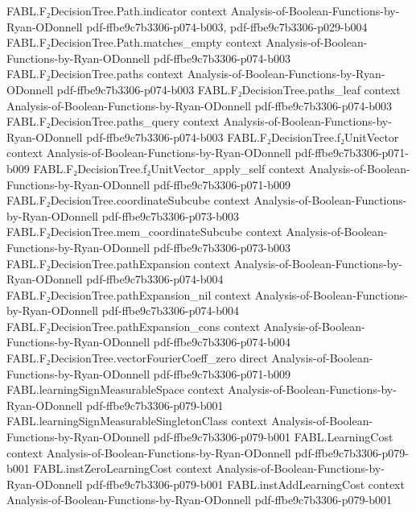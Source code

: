 \begin{theorem}
\proofstep
  {FABL.F₂DecisionTree.Path.indicator}
  {context}
  {Analysis-of-Boolean-Functions-by-Ryan-ODonnell}
  {pdf-ffbe9c7b3306-p074-b003,
    pdf-ffbe9c7b3306-p029-b004}
\proofstep
  {FABL.F₂DecisionTree.Path.matches_empty}
  {context}
  {Analysis-of-Boolean-Functions-by-Ryan-ODonnell}
  {pdf-ffbe9c7b3306-p074-b003}
\proofstep
  {FABL.F₂DecisionTree.paths}
  {context}
  {Analysis-of-Boolean-Functions-by-Ryan-ODonnell}
  {pdf-ffbe9c7b3306-p074-b003}
\proofstep
  {FABL.F₂DecisionTree.paths_leaf}
  {context}
  {Analysis-of-Boolean-Functions-by-Ryan-ODonnell}
  {pdf-ffbe9c7b3306-p074-b003}
\proofstep
  {FABL.F₂DecisionTree.paths_query}
  {context}
  {Analysis-of-Boolean-Functions-by-Ryan-ODonnell}
  {pdf-ffbe9c7b3306-p074-b003}
\proofstep
  {FABL.F₂DecisionTree.f₂UnitVector}
  {context}
  {Analysis-of-Boolean-Functions-by-Ryan-ODonnell}
  {pdf-ffbe9c7b3306-p071-b009}
\proofstep
  {FABL.F₂DecisionTree.f₂UnitVector_apply_self}
  {context}
  {Analysis-of-Boolean-Functions-by-Ryan-ODonnell}
  {pdf-ffbe9c7b3306-p071-b009}
\proofstep
  {FABL.F₂DecisionTree.coordinateSubcube}
  {context}
  {Analysis-of-Boolean-Functions-by-Ryan-ODonnell}
  {pdf-ffbe9c7b3306-p073-b003}
\proofstep
  {FABL.F₂DecisionTree.mem_coordinateSubcube}
  {context}
  {Analysis-of-Boolean-Functions-by-Ryan-ODonnell}
  {pdf-ffbe9c7b3306-p073-b003}
\proofstep
  {FABL.F₂DecisionTree.pathExpansion}
  {context}
  {Analysis-of-Boolean-Functions-by-Ryan-ODonnell}
  {pdf-ffbe9c7b3306-p074-b004}
\proofstep
  {FABL.F₂DecisionTree.pathExpansion_nil}
  {context}
  {Analysis-of-Boolean-Functions-by-Ryan-ODonnell}
  {pdf-ffbe9c7b3306-p074-b004}
\proofstep
  {FABL.F₂DecisionTree.pathExpansion_cons}
  {context}
  {Analysis-of-Boolean-Functions-by-Ryan-ODonnell}
  {pdf-ffbe9c7b3306-p074-b004}
\proofstep
  {FABL.F₂DecisionTree.vectorFourierCoeff_zero}
  {direct}
  {Analysis-of-Boolean-Functions-by-Ryan-ODonnell}
  {pdf-ffbe9c7b3306-p071-b009}
\proofstep
  {FABL.learningSignMeasurableSpace}
  {context}
  {Analysis-of-Boolean-Functions-by-Ryan-ODonnell}
  {pdf-ffbe9c7b3306-p079-b001}
\proofstep
  {FABL.learningSignMeasurableSingletonClass}
  {context}
  {Analysis-of-Boolean-Functions-by-Ryan-ODonnell}
  {pdf-ffbe9c7b3306-p079-b001}
\proofstep
  {FABL.LearningCost}
  {context}
  {Analysis-of-Boolean-Functions-by-Ryan-ODonnell}
  {pdf-ffbe9c7b3306-p079-b001}
\proofstep
  {FABL.instZeroLearningCost}
  {context}
  {Analysis-of-Boolean-Functions-by-Ryan-ODonnell}
  {pdf-ffbe9c7b3306-p079-b001}
\proofstep
  {FABL.instAddLearningCost}
  {context}
  {Analysis-of-Boolean-Functions-by-Ryan-ODonnell}
  {pdf-ffbe9c7b3306-p079-b001}

\end{theorem}
